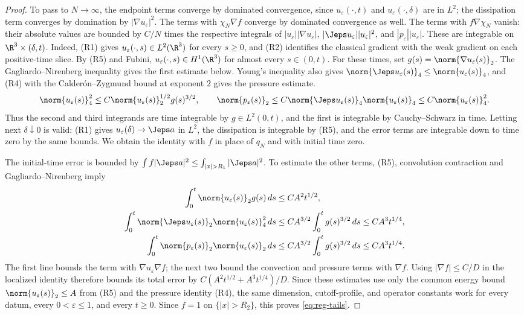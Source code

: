 \documentclass[11pt,reqno]{amsart}
\begin{document}
\begin{proof}
To pass to $N\to\infty$, the endpoint terms converge by dominated
convergence, since $u_\varepsilon(\cdot,t)$ and
$u_\varepsilon(\cdot,\delta)$ are in $L^2$; the dissipation term converges
by domination by $|\nabla u_\varepsilon|^2$. The terms with $\chi_N\nabla f$
converge by dominated convergence as well. The terms with
$f\nabla\chi_N$ vanish: their absolute values are bounded by $C/N$ times the
respective integrals of $|u_\varepsilon||\nabla u_\varepsilon|$,
$|\Jeps u_\varepsilon||u_\varepsilon|^2$, and
$|p_\varepsilon||u_\varepsilon|$. These are integrable on
$\R^3\times(\delta,t)$. Indeed, (R1) gives
$u_\varepsilon(\cdot,s)\in L^2(\R^3)$ for every $s\geq0$, and (R2) identifies
the classical gradient with the weak gradient on each positive-time slice.
By (R5) and Fubini, $u_\varepsilon(\cdot,s)\in H^1(\R^3)$ for almost every
$s\in(0,t)$. For these times, set
$g(s)=\norm{\nabla u_\varepsilon(s)}_2$. The Gagliardo--Nirenberg inequality
gives the first estimate below. Young's inequality also gives
$\norm{\Jeps u_\varepsilon(s)}_4\leq\norm{u_\varepsilon(s)}_4$, and (R4) with
the Calder\'on--Zygmund bound at exponent $2$ gives the pressure estimate.
\[
  \norm{u_\varepsilon(s)}_4^2
      \leq C\norm{u_\varepsilon(s)}_2^{1/2}g(s)^{3/2},
  \qquad
  \norm{p_\varepsilon(s)}_2
      \leq C\norm{\Jeps u_\varepsilon(s)}_4
                \norm{u_\varepsilon(s)}_4
      \leq C\norm{u_\varepsilon(s)}_4^2.
\]
Thus the second and third integrands are time integrable by
$g\in L^2(0,t)$, and the first is integrable by Cauchy--Schwarz in time.
Letting next $\delta\downarrow0$ is valid: (R1) gives
$u_\varepsilon(\delta)\to\Jeps a$ in $L^2$, the dissipation is integrable by
(R5), and the error terms are integrable down to time zero by the same bounds.
We obtain the identity with $f$ in place of $q_N$ and with initial time zero.

The initial-time error is bounded by
$\int f|\Jeps a|^2\leq\int_{|x|>R_1}|\Jeps a|^2$. To estimate the other
terms, (R5), convolution contraction and Gagliardo--Nirenberg imply
\begin{align*}
  \int_0^t\norm{u_\varepsilon(s)}_2g(s)\,ds
     &\leq C A^2t^{1/2},\\
  \int_0^t\norm{\Jeps u_\varepsilon(s)}_2
                  \norm{u_\varepsilon(s)}_4^2\,ds
     &\leq C A^{3/2}\int_0^t g(s)^{3/2}\,ds
      \leq C A^3t^{1/4},\\
  \int_0^t\norm{p_\varepsilon(s)}_2
                  \norm{u_\varepsilon(s)}_2\,ds
     &\leq C A^{3/2}\int_0^t g(s)^{3/2}\,ds
      \leq C A^3t^{1/4}.
\end{align*}
The first line bounds the term with $\nabla u_\varepsilon\nabla f$; the next
two bound the convection and pressure terms with $\nabla f$. Using
$|\nabla f|\leq C/D$ in the localized identity therefore bounds its total
error by $C(A^2t^{1/2}+A^3t^{1/4})/D$. Since these estimates use only the
common energy bound $\norm{u_\varepsilon(s)}_2\le A$ from (R5) and the
pressure identity (R4), the same dimension, cutoff-profile, and operator
constants work for every datum, every $0<\varepsilon\le1$, and every $t\ge0$.
Since $f=1$ on $\{|x|>R_2\}$, this proves \eqref{eq:reg-tails}.


\end{proof}
\end{document}
